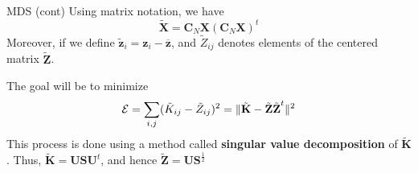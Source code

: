 \documentclass{beamer}
\begin{document}
\begin{frame}{MDS (cont)}
	Using matrix notation, we have 
	\begin{equation*}
		\tilde{\textbf{X}}= \textbf{C}_N \textbf{X} (\textbf{C}_N \textbf{X} )^t
	\end{equation*}
	Moreover, if we define $\tilde{\textbf{z}}_i = \textbf{z}_i - \overline{\textbf{z}}$, and $\tilde{Z}_{ij}$ denotes elements of the centered matrix $\tilde{\textbf{Z}}$.
	
	The goal will be to minimize 
	\begin{equation*}
		{\cal E}= \sum_{i,j} ( \tilde{K}_{ij} - \tilde{Z}_{ij})^2= \| \tilde{\textbf{K}}- \tilde{\textbf{Z}}\tilde{\textbf{Z}}^t \|^2
	\end{equation*}
	This process is done using a method called \textbf{singular value decomposition} of $\tilde{\textbf{K}}$. Thus, $\tilde{\textbf{K}}=\textbf{U} \textbf{S} \textbf{U}^t$, and hence $\tilde{\textbf{Z}}= \textbf{U} \textbf{S}^{\frac{1}{2}}$
\end{frame}


%
%
\end{document}
